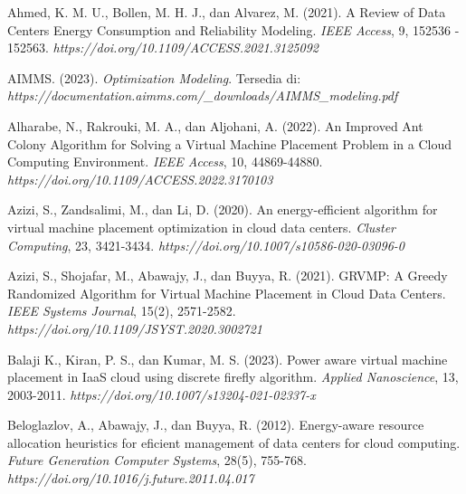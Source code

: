 \begin{thebibliography}{99}

	Ahmed, K. M. U., Bollen, M. H. J., dan Alvarez, M. (2021). A Review of Data Centers Energy Consumption and Reliability Modeling. \textit{IEEE Access}, 9, 152536 - 152563. \textit{https://doi.org/10.1109/ACCESS.2021.3125092}
	
	

	AIMMS. (2023). \textit{Optimization Modeling}. Tersedia di: \textit{https://documentation.aimms.com/_downloads/AIMMS_modeling.pdf}
	
	

	Alharabe, N., Rakrouki, M. A., dan Aljohani, A. (2022). An Improved Ant Colony Algorithm for Solving a Virtual Machine Placement Problem in a Cloud Computing Environment. \textit{IEEE Access}, 10, 44869-44880. \textit{https://doi.org/10.1109/ACCESS.2022.3170103}
	
	

	Azizi, S., Zandsalimi, M., dan Li, D. (2020). An energy-efficient algorithm for virtual machine placement optimization in cloud data centers. \textit{Cluster Computing}, 23, 3421-3434. \textit{https://doi.org/10.1007/s10586-020-03096-0}
	
	

	Azizi, S., Shojafar, M., Abawajy, J., dan Buyya, R. (2021). GRVMP: A Greedy Randomized Algorithm for Virtual Machine Placement in Cloud Data Centers. \textit{IEEE Systems Journal}, 15(2), 2571-2582. \textit{https://doi.org/10.1109/JSYST.2020.3002721}
	
	

	Balaji K., Kiran, P. S., dan Kumar, M. S. (2023). Power aware virtual machine placement in IaaS cloud using discrete firefly algorithm. \textit{Applied Nanoscience}, 13, 2003-2011. \textit{https://doi.org/10.1007/s13204-021-02337-x}

	

	Beloglazlov, A., Abawajy, J., dan Buyya, R. (2012). Energy-aware resource allocation heuristics for eficient management of data centers for cloud computing. \textit{Future Generation Computer Systems}, 28(5), 755-768. \textit{https://doi.org/10.1016/j.future.2011.04.017}
	


\end{thebibliography}
